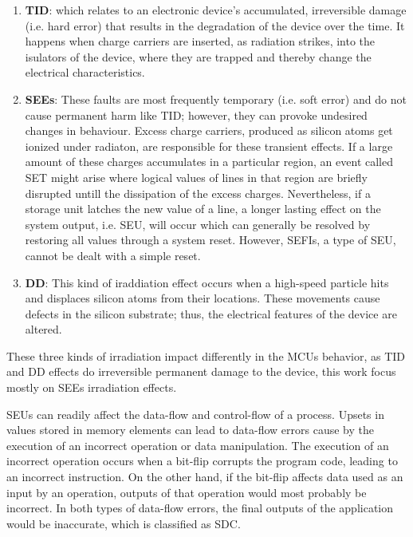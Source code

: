 \documentclass[10pt, a4paper]{report}
\begin{document}
\begin{enumerate}

    \item \textbf{\acrfull{TID}}: which relates to an electronic device's
        accumulated, irreversible damage (i.e. hard error) that results in the
        degradation of the device over the time. It happens when charge carriers
        are inserted, as radiation strikes, into the isulators of the device,
        where they are trapped and thereby change the electrical
        characteristics.
    \item \textbf{\acrfull{SEEs}}: These faults are most frequently temporary
        (i.e. soft error) and do not cause permanent harm like \acrshort{TID};
        however, they can provoke undesired changes in behaviour. Excess charge
        carriers, produced as silicon atoms get ionized under radiaton, are
        responsible for these transient effects. If a large amount of these
        charges accumulates in a particular region, an event called 
        \acrfull{SET} might arise where logical values of lines in that region
        are briefly disrupted untill the dissipation of the excess charges.
        Nevertheless, if a storage unit latches the new value of a line, a
        longer lasting effect on the system output, i.e. \acrfull{SEU}, will
        occur which can generally be resolved by restoring all values through a
        system reset. However, \acrfull{SEFIs}, a type of \acrshort{SEU}, cannot
        be dealt with a simple reset.
    \item \textbf{\acrfull{DD}}: This kind of iraddiation effect occurs when a
        high-speed particle hits and displaces silicon atoms from their
        locations. These movements cause defects in the silicon substrate; thus,
        the electrical features of the device are altered.
\end{enumerate}

These three kinds of irradiation impact differently in the \acrshort{MCU}s
behavior, as \acrshort{TID} and \acrshort{DD} effects do irreversible permanent 
damage to the device, this work focus mostly on \acrshort{SEEs} irradiation
effects.

\acrshort{SEU}s can readily affect the data-flow and control-flow of a
process. Upsets in values stored in memory elements can lead to data-flow errors 
cause by the execution of an incorrect operation or data manipulation. The
execution of an incorrect operation occurs when a bit-flip corrupts the program
code, leading to an incorrect instruction. On the other hand, if the bit-flip
affects data used as an input by an operation, outputs of that operation would
most probably be incorrect. In both types of data-flow errors, the final outputs
of the application would be inaccurate, which is classified as \acrshort{SDC}.
\end{document}
